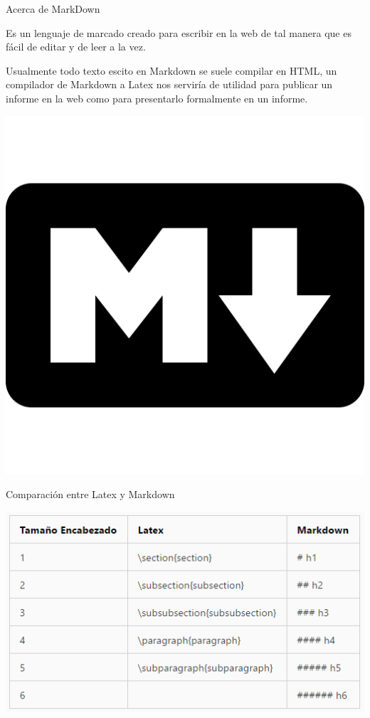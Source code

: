 \documentclass[11pt]{beamer}
\begin{document}
\begin{frame}
\titlepage
\end{frame}

\begin{frame}
\tableofcontents
\end{frame}

\begin{frame}{Acerca de MarkDown}

Es un lenguaje de marcado creado para escribir en la web de tal manera que es fácil de editar y de leer a la vez.

Usualmente todo texto escito en Markdown se suele compilar en HTML, un compilador de Markdown a Latex nos serviría de utilidad para publicar un informe en la web como para presentarlo formalmente en un informe.
\begin{center}
\includegraphics[scale=0.2]{imagenes/markdown-512.png} 
\end{center}
\end{frame}

\begin{frame}{Comparación entre Latex y Markdown}
\begin{center}
\includegraphics[scale=0.8]{imagenes/com.png} 
\end{center}
\end{frame}
\end{document}
